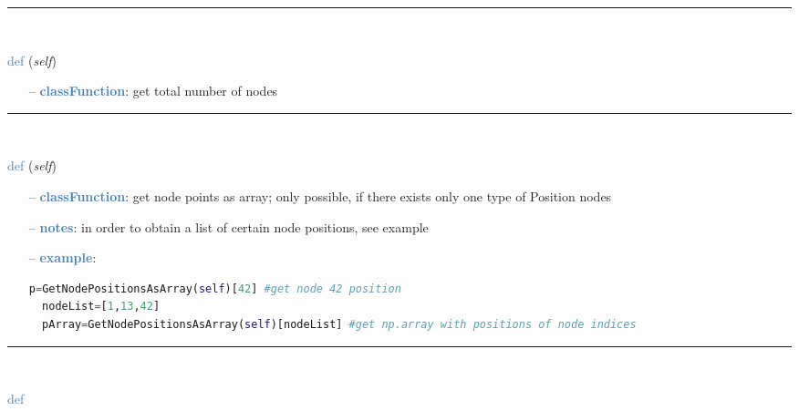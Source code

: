 \begin{itemize}[leftmargin=1.4cm]
\begin{itemize}[leftmargin=1.4cm]
\begin{itemize}[leftmargin=1.4cm]
\begin{itemize}[leftmargin=0.5cm]
\begin{itemize}[leftmargin=1.4cm]
\begin{itemize}[leftmargin=1.4cm]
\begin{itemize}[leftmargin=1.4cm]
\begin{itemize}[leftmargin=0.5cm]
%
\noindent\rule{8cm}{0.75pt}\vspace{1pt} \\ 
\begin{flushleft}
\noindent \textcolor{steelblue}{def {\bf {}}}\label{sec:FEM:FEMinterface:NumberOfNodes}
({\it self})
\end{flushleft}
\setlength{\itemindent}{0.7cm}
\begin{itemize}[leftmargin=0.7cm]
\item[--]\textcolor{steelblue}{\bf classFunction}: get total number of nodes
\vspace{12pt}\end{itemize}
%
\noindent\rule{8cm}{0.75pt}\vspace{1pt} \\ 
\begin{flushleft}
\noindent \textcolor{steelblue}{def {\bf {}}}\label{sec:FEM:FEMinterface:GetNodePositionsAsArray}
({\it self})
\end{flushleft}
\setlength{\itemindent}{0.7cm}
\begin{itemize}[leftmargin=0.7cm]
\item[--]\textcolor{steelblue}{\bf classFunction}: get node points as array; only possible, if there exists only one type of Position nodes
\item[--]\textcolor{steelblue}{\bf notes}: in order to obtain a list of certain node positions, see example
\item[--]\textcolor{steelblue}{\bf example}: \vspace{-12pt}\ei\begin{lstlisting}[language=Python, xleftmargin=36pt]
  p=GetNodePositionsAsArray(self)[42] #get node 42 position
  nodeList=[1,13,42]
  pArray=GetNodePositionsAsArray(self)[nodeList] #get np.array with positions of node indices
\end{lstlisting}\vspace{-24pt}\bi\item[]\vspace{-24pt}\vspace{12pt}\end{itemize}
%
\noindent\rule{8cm}{0.75pt}\vspace{1pt} \\ 
\begin{flushleft}
\noindent \textcolor{steelblue}{def {\bf {}}}\label{sec:FEM:FEMinterface:GetNodePositionsMean}

\end{flushleft}
\end{itemize}
\end{itemize}
\end{itemize}
\end{itemize}
\end{itemize}
\end{itemize}
\end{itemize}
\end{itemize}
